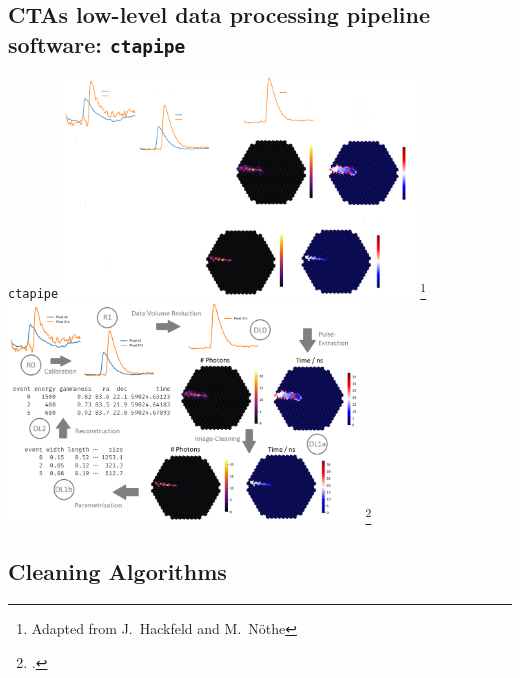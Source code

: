 \subsection{CTAs low-level data processing pipeline software: \texttt{ctapipe}}
\begin{frame}{\texttt{ctapipe}}
  \centering
  \ifdefined\darktheme
    \includegraphics[width=0.7\textwidth]{graphics/ctapipe_darktheme.png}
    \footnote{\textcolor{white!85!black}{Adapted from J.~Hackfeld and M.~Nöthe}}
  \else
    \includegraphics[width=0.7\textwidth]{graphics/ctapipe.png}
    \footcite[\textcolor{darkgray!85!black}{Image Credit:}][]{hackfeld}
  \fi
\end{frame}

\subsection{Cleaning Algorithms}
\ifdefined\darktheme
  
\else
  
\fi